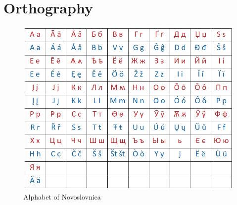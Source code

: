 \chapter{Orthography}

\begin{figure}
	\includegraphics[width=\linewidth]{./sources/alphabet.jpg}
	\caption{Alphabet of Novoslovnica}
	\label{fig:alphabet}
\end{figure}




